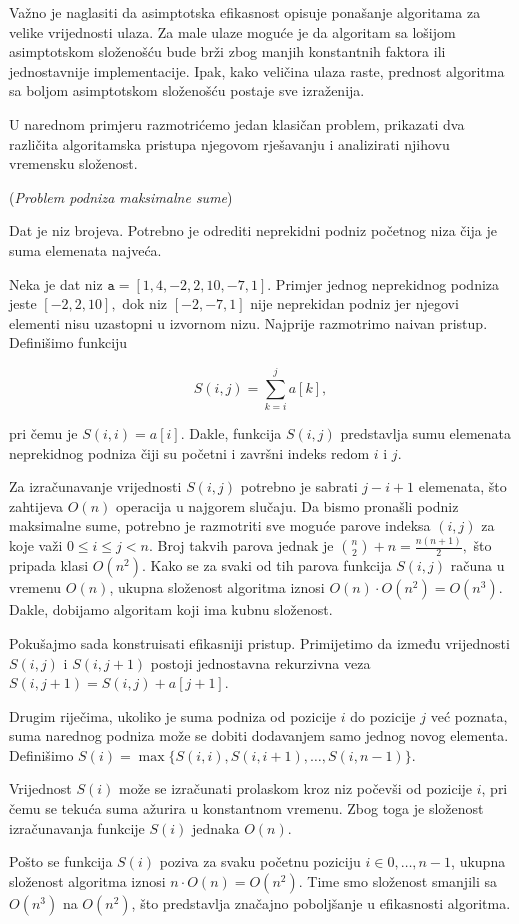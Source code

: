 Važno je naglasiti da asimptotska efikasnost opisuje ponašanje algoritama za velike vrijednosti ulaza. Za male ulaze moguće je da algoritam sa lošijom asimptotskom složenošću bude brži zbog manjih konstantnih faktora ili jednostavnije implementacije. Ipak, kako veličina ulaza raste, prednost algoritma sa boljom asimptotskom složenošću postaje sve izraženija.


U narednom primjeru razmotrićemo jedan klasičan problem, prikazati dva različita algoritamska pristupa njegovom rješavanju i analizirati njihovu vremensku složenost.

\begin{example}(\textit{Problem podniza maksimalne sume})
	
	Dat je niz brojeva. Potrebno je odrediti neprekidni podniz početnog niza čija je suma elemenata najveća.
\end{example}

\begin{solution}
	
	Neka je dat niz $
	\texttt{a}=[1,4,-2,2,10,-7,1].
	$ 	Primjer jednog neprekidnog podniza jeste $[-2,2,10],$ 	dok niz $[-2,-7,1]$ nije neprekidan podniz jer njegovi elementi nisu uzastopni u izvornom nizu. 	Najprije razmotrimo naivan pristup. Definišimo funkciju
	
	$$
	S(i,j)=\sum_{k=i}^{j} a[k],
	$$
	
	pri čemu je $S(i,i)=a[i]$. 	Dakle, funkcija $S(i,j)$ predstavlja sumu elemenata neprekidnog podniza čiji su početni i završni indeks redom $i$ i $j$.
	
	Za izračunavanje vrijednosti $S(i,j)$ potrebno je sabrati $j-i+1$ elemenata, što zahtijeva $O(n)$ operacija u najgorem slučaju. 	Da bismo pronašli podniz maksimalne sume, potrebno je razmotriti sve moguće parove indeksa $(i,j)$ za koje važi $0 \leq i \leq j < n$. Broj takvih parova jednak je $
	\binom{n}{2}+n=\frac{n(n+1)}{2},
	$ što pripada klasi $O(n^2)$. Kako se za svaki od tih parova funkcija $S(i,j)$ računa u vremenu $O(n)$, ukupna složenost algoritma iznosi $
	O(n)\cdot O(n^2)=O(n^3).
	$	Dakle, dobijamo algoritam koji ima kubnu složenost.
	
	Pokušajmo sada konstruisati efikasniji pristup. Primijetimo da između vrijednosti $S(i,j)$ i $S(i,j+1)$ postoji jednostavna rekurzivna veza	$
	S(i,j+1)=S(i,j)+a[j+1].
	$
	
	Drugim riječima, ukoliko je suma podniza od pozicije $i$ do pozicije $j$ već poznata, suma narednog podniza može se dobiti dodavanjem samo jednog novog elementa. 	Definišimo 	
	$
	S(i)=\max\{S(i,i),S(i,i+1),\ldots,S(i,n-1)\}.$
	
	Vrijednost $S(i)$ može se izračunati prolaskom kroz niz počevši od pozicije $i$, pri čemu se tekuća suma ažurira u konstantnom vremenu. Zbog toga je složenost izračunavanja funkcije $S(i)$ jednaka $O(n)$.
	
	Pošto se funkcija $S(i)$ poziva za svaku početnu poziciju $i \in {0,\ldots,n-1}$, ukupna složenost algoritma iznosi 	$
	n \cdot O(n)=O(n^2).
	$ Time smo složenost smanjili sa $O(n^3)$ na $O(n^2)$, što predstavlja značajno poboljšanje u efikasnosti algoritma.
	
\end{solution}

